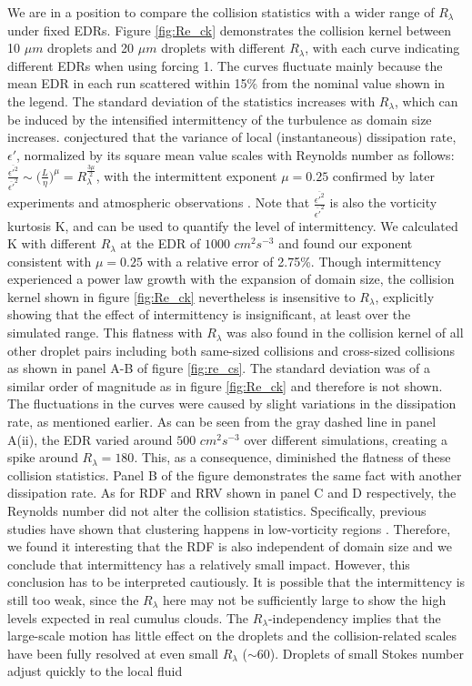 We are in a position to compare the collision statistics with a wider range of $R_\lambda$ under fixed EDRs. Figure \ref{fig:Re_ck} demonstrates the collision kernel between 10 $\mu m$ droplets and 20 $\mu m$ droplets with different $R_\lambda$, with each curve indicating different EDRs when using forcing 1. The curves fluctuate mainly because the mean EDR in each run scattered within 15\% from the nominal value shown in the legend. The standard deviation of the statistics increases with $R_\lambda$, which can be induced by the intensified intermittency of the turbulence as domain size increases. \citet{Kolmogorov1962} conjectured that the variance of local (instantaneous) dissipation rate, $\epsilon\prime$, normalized by its square mean value scales with Reynolds number as follows: $\frac{\overline{\epsilon\prime^2}} {\overline{\epsilon\prime}^2} \sim \big(\frac{L}{\eta}\big)^\mu = R_\lambda^{\frac{3\mu}{2}}$, with the intermittent exponent $\mu = 0.25$ confirmed by later experiments and atmospheric observations \citep[e.g., ][]{Pope2000, Siebert2010}. Note that $\frac{\overline{\epsilon\prime^2 }} {\overline{\epsilon\prime}^2}$ is also the vorticity kurtosis K, and can be used to quantify the level of intermittency. We calculated K with different $R_\lambda$ at the EDR of $1000$ $cm^2s^{-3}$ and found our exponent consistent with $\mu=0.25$ with a relative error of 2.75\%. Though intermittency experienced a power law growth with the expansion of domain size, the collision kernel shown in figure \ref{fig:Re_ck} nevertheless is insensitive to $R_\lambda$, explicitly showing that the effect of intermittency is insignificant, at least over the simulated range. This flatness with $R_\lambda$ was also found in the collision kernel of all other droplet pairs including both same-sized collisions and cross-sized collisions as shown in panel A-B of figure \ref{fig:re_cs}. The standard deviation was of a similar order of magnitude as in figure \ref{fig:Re_ck} and therefore is not shown. The fluctuations in the curves were caused by slight variations in the dissipation rate, as mentioned earlier. As can be seen from the gray dashed line in panel A(ii), the EDR varied around $500$ $cm^2 s^{-3}$ over different simulations, creating a spike around $R_\lambda = 180$. This, as a consequence, diminished the flatness of these collision statistics. Panel B of the figure demonstrates the same fact with another dissipation rate. As for RDF and RRV shown in panel C and D respectively, the Reynolds number did not alter the collision statistics. Specifically, previous studies have shown that clustering happens in low-vorticity regions \citep[e.g., ][]{Maxey1987}. Therefore, we found it interesting that the RDF is also independent of domain size and we conclude that intermittency has a relatively small impact. However, this conclusion has to be interpreted cautiously. It is possible that the intermittency is still too weak, since the $R_\lambda$ here may not be sufficiently large to show the high levels expected in real cumulus clouds. The $R_\lambda$-independency implies that the large-scale motion has little effect on the droplets and the collision-related scales have been fully resolved at even small $R_\lambda$ ($\sim 60$). Droplets of small Stokes number adjust quickly to the local fluid 
